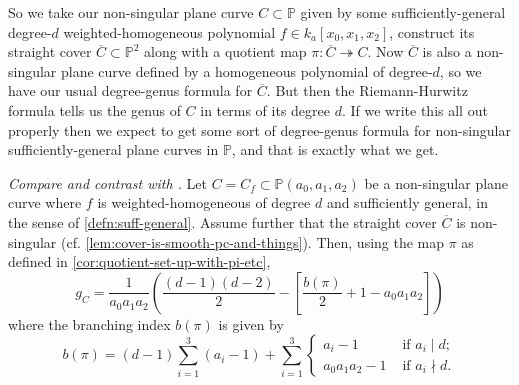 \documentclass[10pt,notitlepage]{article}
\numberwithin{equation}{subsection}
\newcommand{\pee}{\mathbb{P}}
\newcommand{\cover}[1]{\overline{#1}}
\newcommand{\kathree}{k_a[x_0,x_1,x_2]}
\newcommand{\pathree}{\pee(a_0,a_1,a_2)}
\begin{document}
            So we take our non-singular plane curve $C\subset\pee$ given by some sufficiently-general degree-$d$ weighted-homogeneous polynomial $f\in\kathree$, construct its straight cover $\cover{C}\subset\pee^2$ along with a quotient map $\pi\colon\cover{C}\twoheadrightarrow C$.
            Now $\cover{C}$ is also a non-singular plane curve defined by a homogeneous polynomial of degree-$d$, so we have our usual degree-genus formula for $\cover{C}$.
            But then the Riemann-Hurwitz formula tells us the genus of $C$ in terms of its degree $d$.
            If we write this all out properly then we expect to get some sort of degree-genus formula for non-singular sufficiently-general plane curves in $\pee$, and that is exactly what we get.

            \begin{theorem}\label{thm:degree-genus}
                \emph{Compare and contrast with \cite[Theorem~12.2]{IanoFletcher:2015wc}.}
                Let $C=C_f\subset\pathree$ be a non-singular plane curve where $f$ is weighted-homogeneous of degree $d$ and sufficiently general, in the sense of \cref{defn:suff-general}.
                Assume further that the straight cover $\cover{C}$ is non-singular (cf. \cref{lem:cover-is-smooth-pc-and-things}).
                Then, using the map $\pi$ as defined in \cref{cor:quotient-set-up-with-pi-etc},
                \[
                    g_C = \frac{1}{a_0a_1a_2}\left(\frac{(d-1)(d-2)}{2}-\left[\frac{b(\pi)}{2}+1-a_0a_1a_2\right]\right)
                \]
                where the branching index $b(\pi)$ is given by
                \[
                    b(\pi) = (d-1)\sum_{i=1}^3 (a_i-1) + \sum_{i=1}^3
                    \begin{cases}
                        a_i-1 &\text{ if }a_i\mid d;\\
                        a_0a_1a_2-1&\text{ if }a_i\nmid d.
                    \end{cases}
                \]
            \end{theorem}
\end{document}
